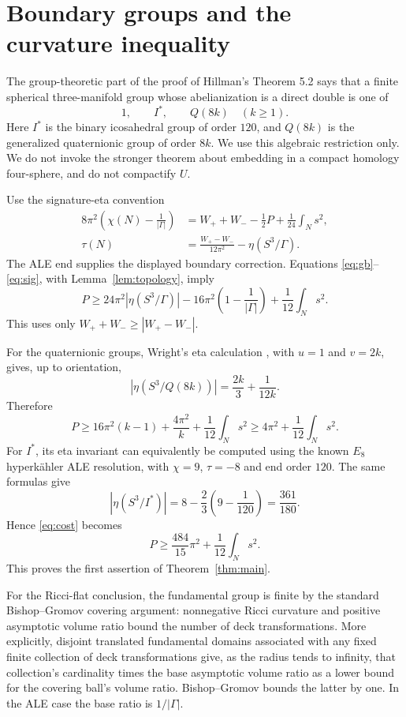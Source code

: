 \documentclass[11pt]{article}
\begin{document}
\section{Boundary groups and the curvature inequality}
The group-theoretic part of the proof of Hillman's Theorem 5.2
\cite{Hillman} says that a finite spherical three-manifold group whose
abelianization is a direct double is one of
\[
                 1,\qquad I^*,\qquad Q(8k)\quad(k\ge1).
\]
Here $I^*$ is the binary icosahedral group of order $120$, and $Q(8k)$
is the generalized quaternionic group of order $8k$.
We use this algebraic restriction only. We do not invoke the stronger theorem
about embedding in a compact homology four-sphere, and do not compactify $U$.

Use the signature-eta convention
\begin{align}
 8\pi^2\left(\chi(N)-\frac1{|\Gamma|}\right)
   &=W_++W_- -\frac12P+\frac1{24}\int_Ns^2,\label{eq:gb}\\
 \tau(N)&=\frac{W_+-W_-}{12\pi^2}-\eta(S^3/\Gamma).
 \label{eq:sig}
\end{align}
The ALE end supplies the displayed boundary correction.
Equations \eqref{eq:gb}--\eqref{eq:sig}, with
Lemma~\ref{lem:topology}, imply
\begin{equation}\label{eq:cost}
 P\ge24\pi^2|\eta(S^3/\Gamma)|
            -16\pi^2\left(1-\frac1{|\Gamma|}\right)+\frac1{12}\int_Ns^2.
\end{equation}
This uses only $W_++W_-\ge|W_+-W_-|$.

For the quaternionic groups, Wright's eta calculation
\cite[Lemma 1]{Wright}, with $u=1$ and $v=2k$, gives, up to orientation,
\[
 |\eta(S^3/Q(8k))|=\frac{2k}{3}+\frac1{12k}.
\]
Therefore
\begin{equation}\label{eq:quaternion}
 P\ge16\pi^2(k-1)+\frac{4\pi^2}{k}+\frac1{12}\int_Ns^2
 \ge4\pi^2+\frac1{12}\int_Ns^2.
\end{equation}
For $I^*$, its eta invariant can equivalently be computed using the known
$E_8$ hyperk\"ahler ALE resolution, with $\chi=9$, $\tau=-8$ and end order
$120$. The same formulas give
\[
 |\eta(S^3/I^*)|=8-\frac23\left(9-\frac1{120}\right)
               =\frac{361}{180}.
\]
Hence \eqref{eq:cost} becomes
\[
                              P\ge\frac{484}{15}\pi^2+\frac1{12}\int_Ns^2.
\]
This proves the first assertion of Theorem~\ref{thm:main}.

For the Ricci-flat conclusion, the fundamental group is finite by the standard
Bishop--Gromov covering argument: nonnegative Ricci curvature and positive
asymptotic volume ratio bound the number of deck transformations. More
explicitly, disjoint translated fundamental domains associated with any fixed
finite collection of deck transformations give, as the radius tends to
infinity, that collection's cardinality times the base asymptotic volume ratio
as a lower bound for the covering ball's volume ratio. Bishop--Gromov bounds
the latter by one. In the ALE case the base ratio is $1/|\Gamma|$.
\end{document}
